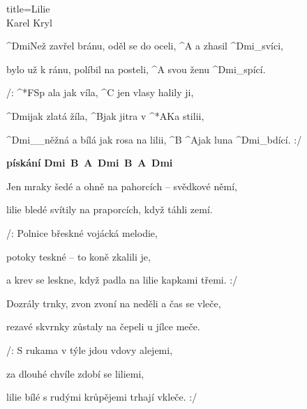 \begin{song}{title=\predtitle\centering Lilie \\\large Karel Kryl  \vspace*{-0.3cm}}  %
\begin{centerjustified}
\nejnejvetsi

\sloka 
	^{Dmi}Než zavřel bránu, oděl se do oceli, ^{A} a zhasil ^{Dmi{\color{white}\_}}svíci,  

	bylo už k ránu, políbil na posteli, ^{A} svou ženu ^{Dmi{\color{white}\_}}spící. 

	/: ^*{F}Sp ala jak víla, ^{C\,\,}jen vlasy halily ji, 
	
	^{Dmi}jak zlatá žíla, ^{B}jak jitra v ^*{A}Ka stilii, 
	
	^{Dmi{\color{white}\_\_}}něžná a bílá jak rosa na lilii, ^{B} ^{A}jak luna ^{Dmi{\color{white}\_}}bdící. :/ 

\phantom{tom}

\textbf{pískání} \textbf{Dmi\, B\, A\, Dmi\, B\, A\, Dmi}

\sloka
	Jen mraky šedé a ohně na pahorcích -- svědkové němí, 
	
	lilie bledé svítily na praporcích, když táhli zemí.

	/: Polnice břeskné vojácká melodie, 

	potoky teskné -- to koně zkalili je, 
	
	a krev se leskne, když padla na lilie kapkami třemi. :/ 

\sloka
	Dozrály trnky, zvon zvoní na neděli a čas se vleče, 

	rezavé skvrnky zůstaly na čepeli u jílce meče.
	
	/: S rukama v týle jdou vdovy alejemi, 

	za dlouhé chvíle zdobí se liliemi, 
	
	lilie bílé s rudými krůpějemi trhají vkleče. :/  


\end{centerjustified}
\setcounter{Slokočet}{0}
\end{song}
